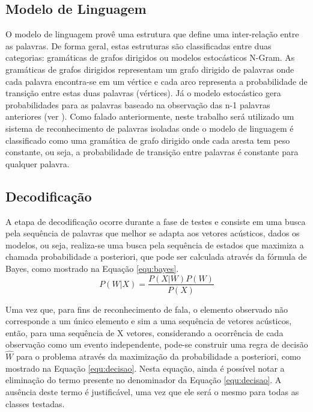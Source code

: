 \documentclass[12pt,a4paper,oneside]{report}
\begin{document}
\subsection{Modelo de Linguagem}

O modelo de linguagem provê uma estrutura que define uma inter-relação entre as palavras. De forma geral, estas estruturas são classificadas entre duas categorias: gramáticas de grafos dirigidos ou modelos estocásticos N-Gram. As gramáticas de grafos dirigidos representam um grafo dirigido de palavras onde cada palavra encontra-se em um vértice e cada arco representa a probabilidade de transição entre estas duas palavras (vértices). Já o modelo estocástico gera probabilidades para as palavras baseado na observação das n-1 palavras anteriores (ver \cite{fsr}). Como falado anteriormente, neste trabalho será utilizado um sistema de reconhecimento de palavras isoladas onde o modelo de linguagem é classificado como uma gramática de grafo dirigido onde cada aresta tem peso constante, ou seja, a probabilidade de transição entre palavras é constante para qualquer palavra.

\subsection{Decodificação}

A etapa de decodificação ocorre durante a fase de testes e consiste em uma busca pela sequência de palavras que melhor se adapta aos vetores acústicos, dados os modelos, ou seja, realiza-se uma busca pela sequência de estados que maximiza a chamada probabilidade a posteriori, que pode ser calculada através da fórmula de Bayes, como mostrado na Equação \ref{equ:bayes}.
\begin{equation}
P(W|X) = \frac{P(X|W)P(W)}{P(X)}
\label{equ:bayes}
\end{equation}

Uma vez que, para fins de reconhecimento de fala, o elemento observado não corresponde a um único elemento e sim a uma sequência de vetores acústicos, então, para uma sequência de X vetores, considerando a ocorrência de cada observação como um evento independente, pode-se construir uma regra de decisão $\widehat{W}$ para o problema através da maximização da probabilidade a posteriori, como mostrado na Equação \ref{equ:decisao}. Nesta equação, ainda é possível notar a eliminação do termo presente no denominador da Equação \ref{equ:decisao}. A ausência deste termo é justificável, uma vez que ele será o mesmo para todas as classes testadas.
\end{document}
